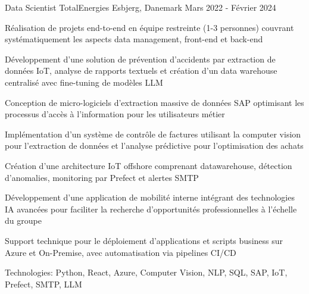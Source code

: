 \begin{cventries}
\cventry
{Data Scientist} %
{TotalEnergies} %
{Esbjerg, Danemark} %
{Mars 2022 - Février 2024} %
{ %
\begin{cvitems}
\item {Réalisation de projets end-to-end en équipe restreinte (1-3 personnes) couvrant systématiquement les aspects data management, front-end et back-end}
\item {Développement d'une solution de prévention d'accidents par extraction de données IoT, analyse de rapports textuels et création d'un data warehouse centralisé avec fine-tuning de modèles LLM}
\item {Conception de micro-logiciels d'extraction massive de données SAP optimisant les processus d'accès à l'information pour les utilisateurs métier}
\item {Implémentation d'un système de contrôle de factures utilisant la computer vision pour l'extraction de données et l'analyse prédictive pour l'optimisation des achats}
\item {Création d'une architecture IoT offshore comprenant datawarehouse, détection d'anomalies, monitoring par Prefect et alertes SMTP}
\item {Développement d'une application de mobilité interne intégrant des technologies IA avancées pour faciliter la recherche d'opportunités professionnelles à l'échelle du groupe}
\item {Support technique pour le déploiement d'applications et scripts business sur Azure et On-Premise, avec automatisation via pipelines CI/CD}
\item {Technologies: Python, React, Azure, Computer Vision, NLP, SQL, SAP, IoT, Prefect, SMTP, LLM}
\end{cvitems}
}
\vspace{1.5em}



\end{cventries}
